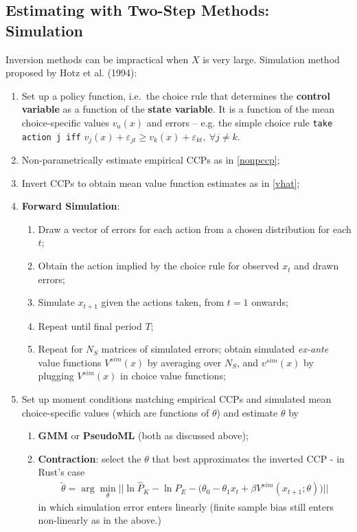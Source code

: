 \documentclass[11pt]{article}
\begin{document}
\subsection{Estimating with Two-Step Methods: Simulation}
	Inversion methods can be impractical when $X$ is very large. Simulation method proposed by Hotz et al. (1994):
  \begin{enumerate}
    \item Set up a policy function, i.e.\ the choice rule that determines the \textbf{control variable} as a function of the \textbf{state variable}. It is a function of the mean choice-specific values $v_a(x)$ and errors -- e.g. the simple choice rule \texttt{take action j iff} $v_j(x) + \varepsilon_{jt} \geq v_k(x) + \varepsilon_{kt}, ~ \forall j \neq k$.
    \item Non-parametrically estimate empirical CCPs as in \eqref{nonpccp};
    \item Invert CCPs to obtain mean value function estimates as in \eqref{vhat};
    \item \textbf{Forward Simulation}:
      \begin{enumerate}
        \item Draw a vector of errors for each action from a chosen distribution for each $t$;
        \item Obtain the action implied by the choice rule for observed $x_t$ and drawn errors;
        \item Simulate $x_{t+1}$ given the actions taken, from $t=1$ onwards;
        \item Repeat until final period $T$;
        \item Repeat for $N_S$ matrices of simulated errors; obtain simulated \textit{ex-ante} value functions $V^{sim}(x)$ by averaging over $N_S$, and $v^{sim}(x)$ by plugging $V^{sim}(x)$ in choice value functions;
      \end{enumerate}
    \item Set up moment conditions matching empirical CCPs and simulated mean choice-specific values (which are functions of $\theta$) and estimate $\theta$ by
    \begin{enumerate}
      \item \textbf{GMM} or \textbf{PseudoML} (both as discussed above);
      \item \textbf{Contraction}: select the $\theta$ that best approximates the inverted CCP - in Rust's case
          \begin{equation}
            \begin{gathered}
                \tilde{\theta} = \arg \min_\theta || \ln \hat{P}_K - \ln \hat{P}_E - \big(\theta_0 - \theta_1 x_t + \beta V^{sim}(x_{t+1}; \theta)\big)||
            \end{gathered}
          \end{equation}
          in which simulation error enters linearly (finite sample bias still enters non-linearly as in the above.)
    \end{enumerate}
  \end{enumerate}
\end{document}
